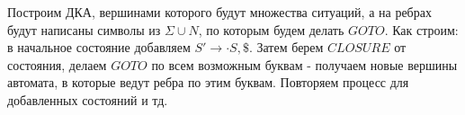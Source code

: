 \par Построим ДКА, вершинами которого будут множества ситуаций, а на ребрах будут написаны символы из $\Sigma \cup N$, по которым будем делать $GOTO$. Как строим: в начальное состояние добавляем $S' \rightarrow \cdot S, \$$. Затем берем $CLOSURE$ от состояния, делаем $GOTO$ по всем возможным буквам - получаем новые вершины автомата, в которые ведут ребра по этим буквам. Повторяем процесс для добавленных состояний и тд.
\begin{figure}[h]
\end{figure}
\\
\\
\\
\\
\\
\\
\\
\\


